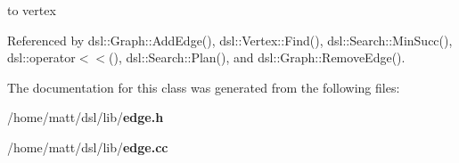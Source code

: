 to vertex 



\-Referenced by dsl\-::\-Graph\-::\-Add\-Edge(), dsl\-::\-Vertex\-::\-Find(), dsl\-::\-Search\-::\-Min\-Succ(), dsl\-::operator$<$$<$(), dsl\-::\-Search\-::\-Plan(), and dsl\-::\-Graph\-::\-Remove\-Edge().



\-The documentation for this class was generated from the following files\-:\begin{DoxyCompactItemize}
\item 
/home/matt/dsl/lib/{\bf edge.\-h}\item 
/home/matt/dsl/lib/{\bf edge.\-cc}\end{DoxyCompactItemize}
